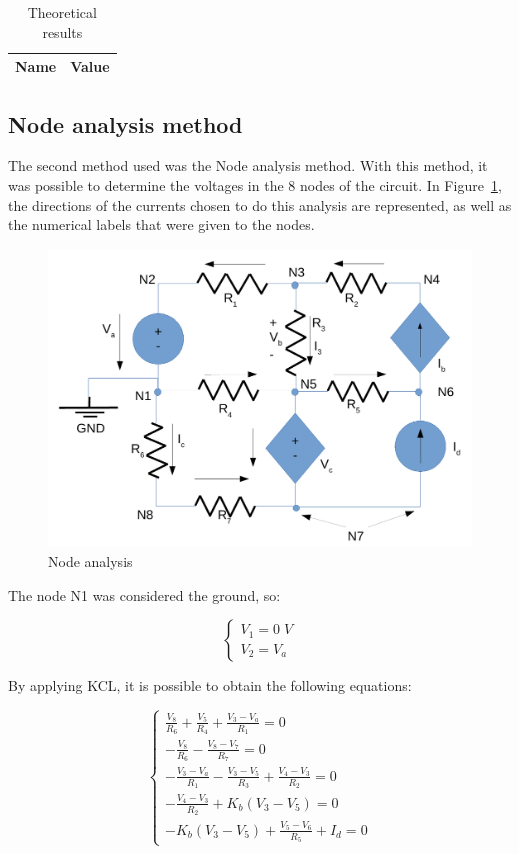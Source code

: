 
\begin{table}[H]
  \centering
  \begin{tabular}{|c|c|}
    \hline
        {\bf Name} & {\bf Value}\\
        \hline
        \hline
        
        \hline
  \end{tabular}
  \caption{Theoretical results}
  \label{mesh_res}
\end{table}

\newpage

\subsection{Node analysis method}
\label{sec:node}

The second method used was the Node analysis method. With this method, it was possible to determine the voltages in the 8 nodes of the circuit. In Figure~\ref{node_fig}, the directions of the currents chosen to do this analysis are represented, as well as the numerical labels that were given to the nodes.

\begin{figure}[H]
  \centering
  \includegraphics[width=0.5\linewidth]{node.pdf}
  \caption{Node analysis}
  \label{node_fig}
\end{figure}

The node N1 was considered the ground, so:

\begin{equation}
  \begin{cases}
    V_1 = 0 \; V \\
    V_2 = V_a
  \end{cases}
\end{equation}

By applying KCL, it is possible to obtain the following equations:

\begin{equation}
  \begin{cases}
    \frac{V_8}{R_6} + \frac{V_5}{R_4} + \frac{V_3-V_a}{R_1} = 0 \\
    -\frac{V_8}{R_6} - \frac{V_8-V_7}{R_7} = 0 \\
    -\frac{V_3-V_a}{R_1} - \frac{V_3-V_5}{R_3} + \frac{V_4-V_3}{R_2} = 0 \\
    -\frac{V_4-V_3}{R_2} + K_b(V_3-V_5) = 0 \\
    -K_b(V_3-V_5) + \frac{V_5-V_6}{R_5} + I_d = 0
  \end{cases}
\end{equation}

